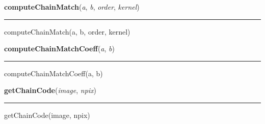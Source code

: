     \label{multireg:chainMoments:computeChainMatch}
    \vspace{0.5ex}

    \begin{boxedminipage}{\textwidth}

    \raggedright \textbf{computeChainMatch}(\textit{a}, \textit{b}, \textit{order}, \textit{kernel})

    \vspace{-1.5ex}

    \rule{\textwidth}{0.5\fboxrule}
    computeChainMatch(a, b, order, kernel)

    \vspace{1ex}

    \end{boxedminipage}

    \label{multireg:chainMoments:computeChainMatchCoeff}
    \vspace{0.5ex}

    \begin{boxedminipage}{\textwidth}

    \raggedright \textbf{computeChainMatchCoeff}(\textit{a}, \textit{b})

    \vspace{-1.5ex}

    \rule{\textwidth}{0.5\fboxrule}
    computeChainMatchCoeff(a, b)

    \vspace{1ex}

    \end{boxedminipage}

    \label{multireg:chainMoments:getChainCode}
    \vspace{0.5ex}

    \begin{boxedminipage}{\textwidth}

    \raggedright \textbf{getChainCode}(\textit{image}, \textit{npix})

    \vspace{-1.5ex}

    \rule{\textwidth}{0.5\fboxrule}
    getChainCode(image, npix)

    \vspace{1ex}

    \end{boxedminipage}

